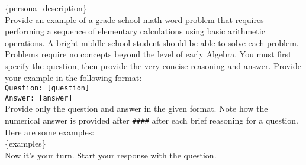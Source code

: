 \begin{tcolorbox}[colback=teal!5!white,colframe=teal!75!black,title=Persona Prompt]
\{persona\_description\}\\

Provide an example of a grade school math word problem that requires performing a sequence of elementary calculations using basic arithmetic operations. A bright middle school student should be able to solve each problem. Problems require no concepts beyond the level of early Algebra. You must first specify the question, then provide the very concise reasoning and answer. Provide your example in the following format:\\

\texttt{Question: [question]} \\
\texttt{Answer: [answer]}\\

Provide only the question and answer in the given format. Note how the numerical answer is provided after \texttt{\#\#\#\#} after each brief reasoning for a question. Here are some examples:\\

\{examples\}\\

Now it's your turn. Start your response with the question.
\end{tcolorbox}
